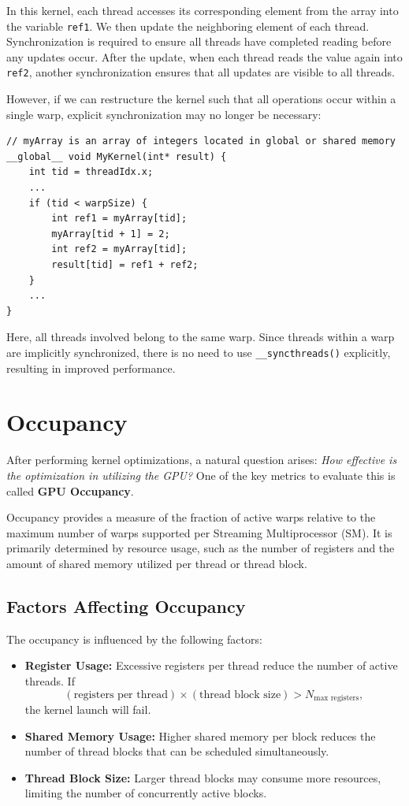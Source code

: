\documentclass[12pt]{book}
\begin{document}
In this kernel, each thread accesses its corresponding element from the array into the variable \texttt{ref1}. We then update the neighboring element of each thread. Synchronization is required to ensure all threads have completed reading before any updates occur. After the update, when each thread reads the value again into \texttt{ref2}, another synchronization ensures that all updates are visible to all threads.

However, if we can restructure the kernel such that all operations occur within a single warp, explicit synchronization may no longer be necessary:

\begin{lstlisting}[style=cppstyle]
// myArray is an array of integers located in global or shared memory
__global__ void MyKernel(int* result) {
    int tid = threadIdx.x;
    ...
    if (tid < warpSize) {
        int ref1 = myArray[tid];
        myArray[tid + 1] = 2;
        int ref2 = myArray[tid];
        result[tid] = ref1 + ref2;
    }
    ...
}
\end{lstlisting}

Here, all threads involved belong to the same warp. Since threads within a warp are implicitly synchronized, there is no need to use \texttt{\_\_syncthreads()} explicitly, resulting in improved performance.

\section{Occupancy}

After performing kernel optimizations, a natural question arises: \emph{How effective is the optimization in utilizing the GPU?} One of the key metrics to evaluate this is called \textbf{GPU Occupancy}. 

Occupancy provides a measure of the fraction of active warps relative to the maximum number of warps supported per Streaming Multiprocessor (SM). It is primarily determined by resource usage, such as the number of registers and the amount of shared memory utilized per thread or thread block.

\subsection*{Factors Affecting Occupancy}
The occupancy is influenced by the following factors:
\begin{itemize}
    \item \textbf{Register Usage:} Excessive registers per thread reduce the number of active threads. If
    \[
    (\text{registers per thread}) \times (\text{thread block size}) > N_{\text{max registers}},
    \]
    the kernel launch will fail.
    
    \item \textbf{Shared Memory Usage:} Higher shared memory per block reduces the number of thread blocks that can be scheduled simultaneously.
    
    \item \textbf{Thread Block Size:} Larger thread blocks may consume more resources, limiting the number of concurrently active blocks.
\end{itemize}
\end{document}
